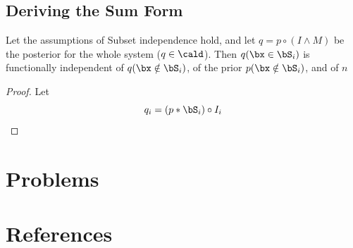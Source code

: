 \documentclass[11pt]{article}
\begin{document}
\subsection{Deriving the Sum Form}
\label{sec:org9f3a551}
\begin{lemma}[]
Let the assumptions of Subset independence hold, and let \(q=p\circ(I\wedge M)\) be the posterior for
the whole system (\(q\in\cald\)). Then \(q(\bx\in\bS_i)\) is functionally independent of
\(q(\bx\notin\bS_i)\), of the prior \(p(\bx\notin\bS_i)\), and of \(n\)
\end{lemma}

\begin{proof}
Let
\begin{equation*}
q_i=(p*\bS_i)\circ I_i
\end{equation*}
\end{proof}
\section{Problems}
\label{sec:orgd44907e}


\section{References}
\label{sec:orgf1aeba8}
\label{bibliographystyle link}



\end{document}
